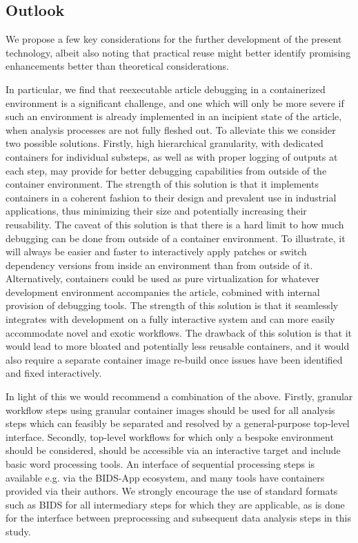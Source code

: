 \subsection{Outlook}

We propose a few key considerations for the further development of the present technology, albeit also noting that practical reuse might better identify promising enhancements better than theoretical considerations.

In particular, we find that reexecutable article debugging in a containerized environment is a significant challenge, and one which will only be more severe if such an environment is already implemented in an incipient state of the article, when analysis processes are not fully fleshed out.
To alleviate this we consider two possible solutions.
Firstly, high hierarchical granularity, with dedicated containers for individual substeps, as well as with proper logging of outputs at each step, may provide for better debugging capabilities from outside of the container environment.
The strength of this solution is that it implements containers in a coherent fashion to their design and prevalent use in industrial applications, thus minimizing their size and potentially increasing their reusability.
The caveat of this solution is that there is a hard limit to how much debugging can be done from outside of a container environment.
To illustrate, it will always be easier and faster to interactively apply patches or switch dependency versions from inside an environment than from outside of it.
Alternatively, containers could be used as pure virtualization for whatever development environment accompanies the article, cobmined with internal provision of debugging tools.
The strength of this solution is that it seamlessly integrates with development on a fully interactive system and can more easily accommodate novel and exotic workflows.
The drawback of this solution is that it would lead to more bloated and potentially less reusable containers, and it would also require a separate container image re-build once issues have been identified and fixed interactively.

In light of this we would recommend a combination of the above.
Firstly, granular workflow steps using granular container images should be used for all analysis steps which can feasibly be separated and resolved by a general-purpose top-level interface.
Secondly, top-level workflows for which only a bespoke environment should be considered, should be accessible via an interactive target and include basic word processing tools.
An interface of sequential processing steps is available e.g. via the BIDS-App ecosystem, and many tools have containers provided via their authors.
We strongly encourage the use of standard formats such as BIDS for all intermediary steps for which they are applicable, as is done for the interface between preprocessing and subsequent data analysis steps in this study.

